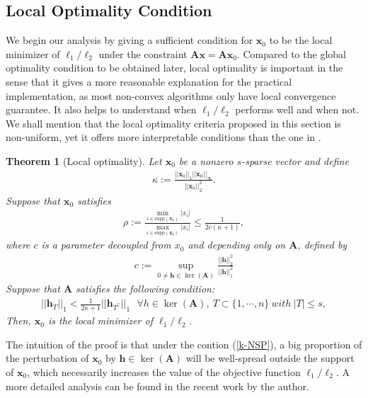 \documentclass[11pt]{article}
\numberwithin{equation}{section}
\theoremstyle{plain}
\newtheorem{Th}{Theorem}[section]
\theoremstyle{definition}
\def\A{{\mathbf A}}
\def\x{{\mathbf x}}
\def\h{{\mathbf{h}}}
\begin{document}
\subsection{Local Optimality Condition}

We begin our analysis by giving a sufficient condition for $\x_0$ to be the local minimizer of $\ell_1/\ell_2$ under the constraint $\A\x=\A\x_0$. Compared to the global optimality condition to be obtained later, local optimality is important in the sense that it gives a more reasonable explanation for the practical implementation, as most non-convex algorithms only have local convergence guarantee. It also helps to understand when $\ell_1/\ell_2$ performs well and when not. We shall mention that the local optimality criteria proposed in this section is non-uniform, yet it offers more interpretable conditions than the one in \cite{rahimi2018scale}.

\begin{Th}[Local optimality]\label{T:local}
Let $\x_0$ be a nonzero $s$-sparse vector and define
\begin{align}
\kappa:=\frac{||\x_0||_1||\x_0||_\infty}{||\x_0||^2_2}.\label{kappa}
\end{align}
Suppose that $\x_0$ satisfies  
\begin{align}
\rho:=\frac{\min_{i\in\text{supp}(\x_0)}|x_i|}{\max_{i\in\text{supp}(\x_0)}|x_i|}\leq\frac{1}{2c(\kappa+1)},\label{ratio}
\end{align}
where $c$ is a parameter decoupled from $x_0$ and depending only on $\A$, defined by 
\begin{align*}
c:=\sup_{0\neq \h\in\ker(\A)}\frac{||\h||^2_2}{||\h||_1^2}
\end{align*}
Suppose that $\A$ satisfies the following condition: 
\begin{align}
||\h_T||_1<\frac{1}{2\kappa+1}||\h_{T^\complement}||_1\ \ \ \forall h\in\ker(\A), \ T\subset\{1, \cdots, n\}\ with\ |T|\leq s,\label{k-NSP}
\end{align}
Then, $\x_0$ is the local minimizer of $\ell_1/\ell_2$.   
\end{Th}


The intuition of the proof is that under the contion (\ref{k-NSP}), a big proportion of the perturbation of $\x_0$ by $\h\in\ker(\A)$ will be well-spread outside the support of $\x_0$, which necessarily increases the value of the objective function $\ell_1/\ell_2$. A more detailed analysis can be found in the recent work by the author. 
\end{document}
